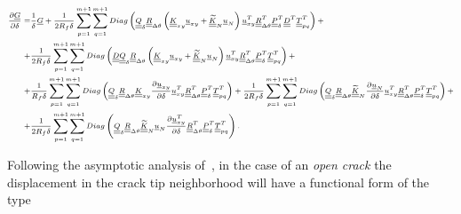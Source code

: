 \begin{equation}\label{paperA:eq:Gdev}
\scriptsize
\begin{split}
\frac{\partial \underline{G}}{\partial \delta}=&\frac{1}{\delta}\underline{G}+\frac{1}{2R_{f}\delta}\sum_{p=1}^{m+1}\sum_{q=1}^{m+1}Diag\left(\underline{\underline{Q}}_{\delta}\underline{\underline{R}}_{\Delta\theta}\left(\underline{\underline{K}}_{xy}\underline{u}_{xy}+\underline{\underline{\widetilde{K}}}_{N}\underline{u}_{N}\right)\underline{u}_{xy}^{T}\underline{\underline{R}}_{\Delta\theta}^{T}\underline{\underline{P}}_{\delta}^{T}\underline{\underline{D}}^{T}\underline{\underline{T}}_{pq}^{T}\right)+\\
+&\frac{1}{2R_{f}\delta}\sum_{p=1}^{m+1}\sum_{q=1}^{m+1}Diag\left(\underline{\underline{D}}\underline{\underline{Q}}_{\delta}\underline{\underline{R}}_{\Delta\theta}\left(\underline{\underline{K}}_{xy}\underline{u}_{xy}+\underline{\underline{\widetilde{K}}}_{N}\underline{u}_{N}\right)\underline{u}_{xy}^{T}\underline{\underline{R}}_{\Delta\theta}^{T}\underline{\underline{P}}_{\delta}^{T}\underline{\underline{T}}_{pq}^{T}\right)+\\
+&\frac{1}{R_{f}\delta}\sum_{p=1}^{m+1}\sum_{q=1}^{m+1}Diag\left(\underline{\underline{Q}}_{\delta}\underline{\underline{R}}_{\Delta\theta}\underline{\underline{K}}_{xy}\frac{\partial \underline{u}_{xy}}{\partial \delta}\underline{u}_{xy}^{T}\underline{\underline{R}}_{\Delta\theta}^{T}\underline{\underline{P}}_{\delta}^{T}\underline{\underline{T}}_{pq}^{T}\right)+\frac{1}{2R_{f}\delta}\sum_{p=1}^{m+1}\sum_{q=1}^{m+1}Diag\left(\underline{\underline{Q}}_{\delta}\underline{\underline{R}}_{\Delta\theta}\underline{\underline{\widetilde{K}}}_{N}\frac{\partial \underline{u}_{N}}{\partial \delta}\underline{u}_{xy}^{T}\underline{\underline{R}}_{\Delta\theta}^{T}\underline{\underline{P}}_{\delta}^{T}\underline{\underline{T}}_{pq}^{T}\right)+\\
+&\frac{1}{2R_{f}\delta}\sum_{p=1}^{m+1}\sum_{q=1}^{m+1}Diag\left(\underline{\underline{Q}}_{\delta}\underline{\underline{R}}_{\Delta\theta}\underline{\underline{\widetilde{K}}}_{N}\underline{u}_{N}\frac{\partial \underline{u}_{xy}^{T}}{\partial \delta}\underline{\underline{R}}_{\Delta\theta}^{T}\underline{\underline{P}}_{\delta}^{T}\underline{\underline{T}}_{pq}^{T}\right).
\end{split}
\end{equation}

Following the asymptotic analysis of~\cite{Williams1959,Comninou1990}, in the case of an \emph{open crack} the displacement in the crack tip neighborhood will have a functional form of the type

